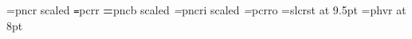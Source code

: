 \def\leadline{\ \leaders\hrule height 2.5pt depth -2pt\hfil\ }
\def\manvers{}%
\def\HEADINGSoff{
\global\evenheadline={\hfil}
\global\evenfootline={\line{\let\,=\thinspace\ftfnt c\,y\,g\,n\,u\,s\quad s\,u\,p\,p\,o\,r\,t\leadline\manvers}}
\global\oddheadline={\hfil}
\global\oddfootline={\line {\let\,=\thinspace\ftfnt c\,y\,g\,n\,u\,s\quad s\,u\,p\,p\,o\,r\,t\leadline\manvers}}}
\def\HEADINGSsingle{
\global\pageno=1\HEADINGSsinglex}
\def\HEADINGSsinglex{
\global\evenfootline={%
{\let\,=\thinspace\ftfnt c\,y\,g\,n\,u\,s\quad s\,u\,p\,p\,o\,r\,t}%
\leadline\manvers}
\global\oddfootline={%
{\let\,=\thinspace\ftfnt c\,y\,g\,n\,u\,s\quad s\,u\,p\,p\,o\,r\,t}%
\leadline\manvers}
\global\evenheadline={\ftfnt\thischapter\leadline
		\ifdraft DRAFT\leadline\fi
		\bf\folio}
\global\oddheadline={\ftfnt\thischapter\leadline
		\ifdraft DRAFT\leadline\fi
		\bf\folio}
}
%
\def\HEADINGSdouble{
\global\pageno=1\HEADINGSdoublex}
\def\HEADINGSdoublex{
\global\evenfootline={%
{\bf\folio}\ftfnt\leadline\ifdraft DRAFT\quad\fi
\ftfnt\manvers\qquad\today
}
\global\oddfootline={%
{\let\,=\thinspace\ftfnt c\,y\,g\,n\,u\,s\quad s\,u\,p\,p\,o\,r\,t}%
\leadline{\bf\folio}%
}
\global\evenheadline={\ftfnt\thistitle\leadline\ifdraft DRAFT\fi}
\global\oddheadline={\rm\leadline\thischapter}
}

\def\finalout{\overfullrule=0pt
	\global\draftfalse
			}

\font\textrm=pncr scaled \magstephalf
\font\texttt=pcrr
\font\textbf=pncb scaled \magstephalf 
\font\textit=pncri scaled \magstephalf
\font\textsl=pcrro
\font\textsf=slcrst at 9.5pt
\font\ftfnt=phvr at 8pt %

